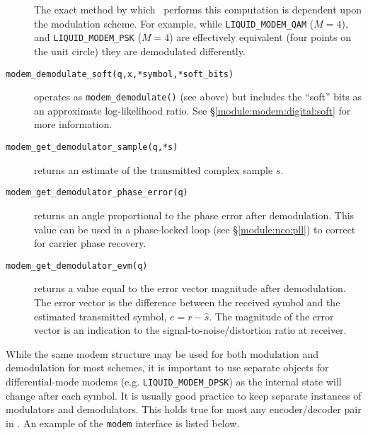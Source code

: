 \begin{description}
    The exact method by which \liquid\ performs this computation is
    dependent upon the modulation scheme.
    For example, while
    {\tt LIQUID\_MODEM\_QAM} ($M=4$), and
    {\tt LIQUID\_MODEM\_PSK} ($M=4$)
    are effectively equivalent (four points on the unit circle)
    they are demodulated differently.
\item[{\tt modem\_demodulate\_soft(q,x,*symbol,*soft\_bits)}]
    operates as {\tt modem\_demodulate()} (see above) but includes the
    ``soft'' bits as an approximate log-likelihood ratio.
    See \S\ref{module:modem:digital:soft} for more information.
\item[{\tt modem\_get\_demodulator\_sample(q,*s)}]
    returns an estimate of the transmitted complex sample $s$.
\item[{\tt modem\_get\_demodulator\_phase\_error(q)}]
    returns an angle proportional to the phase error after demodulation.
    This value can be used in a phase-locked loop
    (see \S\ref{module:nco:pll})
    to correct for carrier phase recovery.
\item[{\tt modem\_get\_demodulator\_evm(q)}]
    returns a value equal to the error vector magnitude after demodulation.
    The error vector is the difference between the received symbol and the
    estimated transmitted symbol, $e = r - \hat{s}$.
    The magnitude of the error vector is an indication to the
    signal-to-noise/distortion ratio at receiver.
\end{description}

While the same modem structure may be used for both modulation and
demodulation for most schemes, it is important to use separate objects
for differential-mode modems (e.g. {\tt LIQUID\_MODEM\_DPSK}) as the internal state
will change after each symbol.
It is usually good practice to keep separate instances of modulators and
demodulators.
This holds true for most any encoder/decoder pair in \liquid.
%
An example of the {\tt modem} interface is listed below.
%

%

